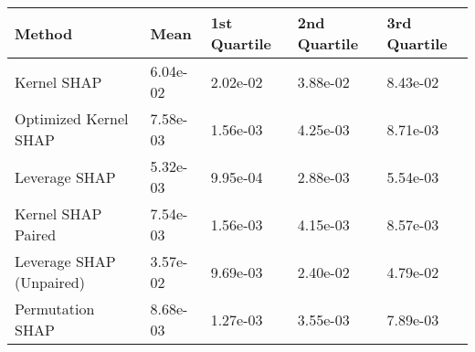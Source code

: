 \begin{tabular}{lllll}
  \toprule
  \textbf{Method} & \textbf{Mean} & \textbf{1st Quartile} & \textbf{2nd Quartile} & \textbf{3rd Quartile} \\ \midrule 
Kernel SHAP & 6.04e-02 & 2.02e-02 & 3.88e-02 & 8.43e-02\\
Optimized Kernel SHAP & \cellcolor{bronze!60}7.58e-03 & \cellcolor{bronze!60}1.56e-03 & 4.25e-03 & 8.71e-03\\
Leverage SHAP & \cellcolor{gold!60}5.32e-03 & \cellcolor{gold!60}9.95e-04 & \cellcolor{gold!60}2.88e-03 & \cellcolor{gold!60}5.54e-03\\
Kernel SHAP Paired & \cellcolor{silver!60}7.54e-03 & \cellcolor{bronze!60}1.56e-03 & \cellcolor{bronze!60}4.15e-03 & \cellcolor{bronze!60}8.57e-03\\
Leverage SHAP (Unpaired) & 3.57e-02 & 9.69e-03 & 2.40e-02 & 4.79e-02\\
Permutation SHAP & 8.68e-03 & \cellcolor{silver!60}1.27e-03 & \cellcolor{silver!60}3.55e-03 & \cellcolor{silver!60}7.89e-03\\
\bottomrule
\end{tabular}